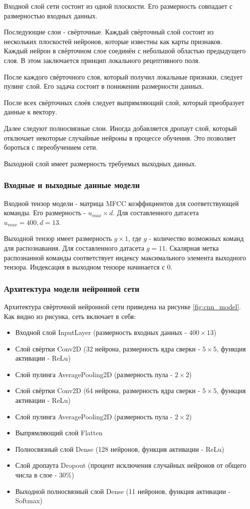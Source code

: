 Входной слой сети состоит из одной плоскости. Его размерность совпадает с размерностью входных данных. 

Последующие слои - свёрточные. Каждый свёрточный слой состоит из нескольких плоскостей нейронов, которые известны как карты признаков. Каждый нейрон в свёрточном слое соединён с небольшой областью предыдущего слоя. В этом заключается принцип локального рецептивного поля.

После каждого свёрточного слоя, который получил локальные признаки, следует пулинг слой. Его задача состоит в понижении размерности данных.

После всех свёрточных слоёв следует выпрямляющий слой, который преобразует данные к вектору. 

Далее следуют полносвязные слои. Иногда добавляется дропаут слой, который отключает некоторые случайные нейроны в процессе обучения. Это позволяет бороться с переобучением сети.

Выходной слой имеет размерность требуемых выходных данных. 

\subsubsection{Входные и выходные данные модели}
Входной тензор модели - матрица MFCC коэффициентов для соответствующей команды. Его размерность - $u_{max} \times d$. Для составленного датасета $u_{max}=400, d=13$.

Выходной тензор имеет размерность $g \times 1$, где $g$ - количество возможных команд для распознавания. Для составленного датасета $g=11$. Скалярная метка распознанной команды соответствует индексу максимального элемента выходного тензора. Индексация в выходном тензоре начинается с 0.
\subsubsection{Архитектура модели нейронной сети}
Архитектура свёрточной нейронной сети приведена на рисунке \ref{fig:cnn_model}. Как видно из рисунка, сеть включает в себя:
\begin{itemize}[leftmargin=2cm]
	\item Входной слой InputLayer (размерность входных данных - $400 \times 13$)
	\item Слой свёртки Conv2D (32 нейрона, размерность ядра сверки - $5 \times 5$, функция активации - ReLu)
	\item Слой пулинга AveragePooling2D (размерность пула - $2 \times 2$)
	\item Слой свёртки Conv2D (64 нейрона, размерность ядра сверки - $5 \times 5$, функция активации - ReLu)
	\item Слой пулинга AveragePooling2D (размерность пула - $2 \times 2$)
	\item Выпрямляющий слой Flatten
	\item Полносвязный слой Dense (128 нейронов, функция активации - ReLu)
	\item Слой дропаута Dropout (процент исключения случайных нейронов от общего числа в слое - 30\%)
	\item Выходной полносвязный слой Dense (11 нейронов, функция активации - Softmax)
\end{itemize}

